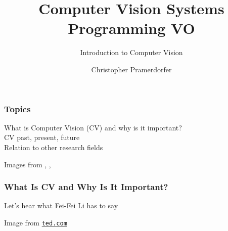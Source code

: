 \documentclass[xetex,professionalfont]{beamer}
\title{Computer Vision Systems Programming VO}
\subtitle{Introduction to Computer Vision}
\author{Christopher Pramerdorfer}
\institute{Computer Vision Lab, Vienna University of Technology}
\renewcommand\emph[1]{\textcolor{tuwcvl_inf_red}{#1}}
\begin{document}

\begin{frame}
\maketitle
\end{frame}


\begin{frame}
\frametitle{Topics}

What is \emph{Computer Vision} (\emph{CV}) and why is it important?\\\medskip
CV past, present, future\\\medskip
Relation to other research fields

\bigskip
\begin{center}
    {\centering Images from \cite{lecun1989}, \cite{shotton2011}, \cite{taigman2013}}
\end{center}

\end{frame}


\begin{frame}
\frametitle{What Is CV and Why Is It Important?}

Let's hear what Fei-Fei Li has to say

\bigskip
\begin{center}
    {\centering Image from \href{https://www.ted.com/talks/fei_fei_li_how_we_re_teaching_computers_to_understand_pictures}{\texttt{ted.com}}}
\end{center}

\end{frame}
\end{document}
